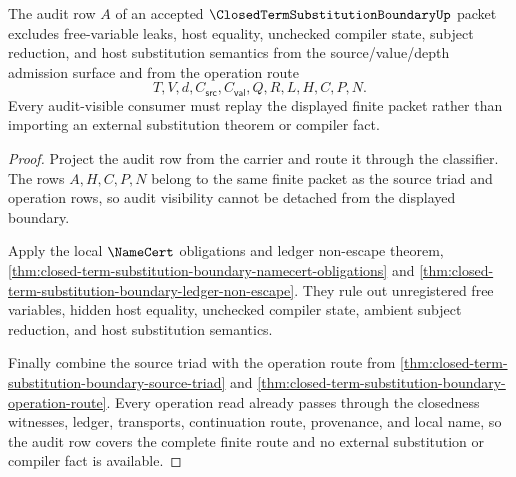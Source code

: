 \begin{theorem}
\label{thm:closed-term-substitution-boundary-audit-nonescape}
The audit row $A$ of an accepted $\ClosedTermSubstitutionBoundaryUp$ packet excludes free-variable leaks, host equality, unchecked compiler state, subject reduction, and host substitution semantics from the source/value/depth admission surface and from the operation route
$$
T,V,d,C_{\mathsf{src}},C_{\mathsf{val}},Q,R,L,H,C,P,N.
$$
Every audit-visible consumer must replay the displayed finite packet rather than importing an external substitution theorem or compiler fact.
\end{theorem}
\begin{proof}
Project the audit row from the carrier and route it through the classifier. The rows $A,H,C,P,N$ belong to the same finite packet as the source triad and operation rows, so audit visibility cannot be detached from the displayed boundary.

Apply the local $\NameCert$ obligations and ledger non-escape theorem, \autoref{thm:closed-term-substitution-boundary-namecert-obligations} and \autoref{thm:closed-term-substitution-boundary-ledger-non-escape}. They rule out unregistered free variables, hidden host equality, unchecked compiler state, ambient subject reduction, and host substitution semantics.

Finally combine the source triad with the operation route from \autoref{thm:closed-term-substitution-boundary-source-triad} and \autoref{thm:closed-term-substitution-boundary-operation-route}. Every operation read already passes through the closedness witnesses, ledger, transports, continuation route, provenance, and local name, so the audit row covers the complete finite route and no external substitution or compiler fact is available.
\end{proof}

